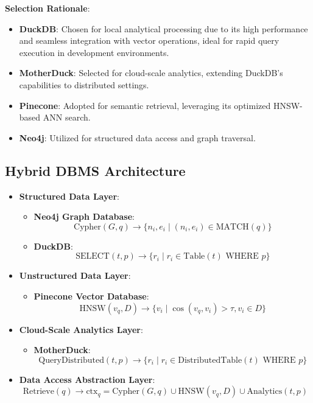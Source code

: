 \documentclass[11pt]{article}
\begin{document}
\textbf{Selection Rationale}:
\begin{itemize}
    \item \textbf{DuckDB}: Chosen for local analytical processing due to its high performance and seamless integration with vector operations, ideal for rapid query execution in development environments.
    \item \textbf{MotherDuck}: Selected for cloud-scale analytics, extending DuckDB’s capabilities to distributed settings.
    \item \textbf{Pinecone}: Adopted for semantic retrieval, leveraging its optimized HNSW-based ANN search.
    \item \textbf{Neo4j}: Utilized for structured data access and graph traversal.
\end{itemize}

\subsection{Hybrid DBMS Architecture}
\label{subsec:hybrid_dbms}

\begin{itemize}
    \item \textbf{Structured Data Layer}:
    \begin{itemize}
        \item \textbf{Neo4j Graph Database}:
        \[
        \text{Cypher}(G, q) \rightarrow \{ n_i, e_i \mid (n_i, e_i) \in \text{MATCH}(q) \}
        \]
        \item \textbf{DuckDB}:
        \[
        \text{SELECT}(t, p) \rightarrow \{ r_i \mid r_i \in \text{Table}(t) \text{ WHERE } p \}
        \]
    \end{itemize}

    \item \textbf{Unstructured Data Layer}:
    \begin{itemize}
        \item \textbf{Pinecone Vector Database}:
        \[
        \text{HNSW}(v_q, D) \rightarrow \{ v_i \mid \cos(v_q, v_i) > \tau, v_i \in D \}
        \]
    \end{itemize}

    \item \textbf{Cloud-Scale Analytics Layer}:
    \begin{itemize}
        \item \textbf{MotherDuck}:
        \[
        \text{QueryDistributed}(t, p) \rightarrow \{ r_i \mid r_i \in \text{DistributedTable}(t) \text{ WHERE } p \}
        \]
    \end{itemize}

    \item \textbf{Data Access Abstraction Layer}:
    \[
    \text{Retrieve}(q) \rightarrow \text{ctx}_q = \text{Cypher}(G, q) \cup \text{HNSW}(v_q, D) \cup \text{Analytics}(t, p)
    \]
\end{itemize}
\end{document}
